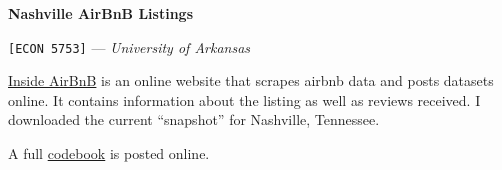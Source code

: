 \documentclass[12pt]{article}
\begin{document}
\begin{center}
  {\Huge\bf Nashville AirBnB Listings}
  
  \smallskip
  {\large\texttt{[ECON 5753]} — \textit{University of Arkansas}}

\end{center}

\href{https://insideairbnb.com/get-the-data/}{Inside AirBnB} is an
online website that scrapes airbnb data and posts datasets online. It
contains information about the listing as well as reviews received. I
downloaded the current ``snapshot'' for Nashville, Tennessee.

A full
\href{https://docs.google.com/spreadsheets/d/1iWCNJcSutYqpULSQHlNyGInUvHg2BoUGoNRIGa6Szc4/edit?gid=1322284596\#gid=1322284596}{codebook}
is posted online.
\end{document}
